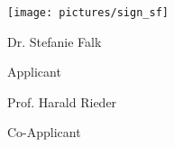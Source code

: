 \vspace{5cm}

\begin{minipage}{.4\textwidth}

  \vspace{-43.5px}
  \texttt{[image: pictures/sign\_sf]}

  \hrulefill
  
  \hspace*{0mm}\phantom{}Dr. Stefanie Falk
  
  \hspace*{0mm}\phantom{}Applicant
\end{minipage}%
\hfill
\begin{minipage}{.4\textwidth}

  \hrulefill
  
  \hspace*{0mm}\phantom{}Prof. Harald Rieder
  
  \hspace*{0mm}\phantom{}Co-Applicant
\end{minipage}


